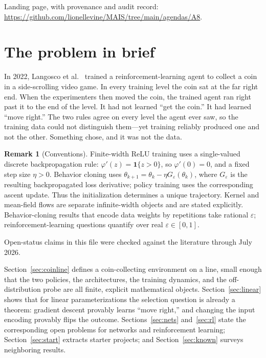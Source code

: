 \documentclass[11pt]{amsart}
\theoremstyle{plain}
\theoremstyle{definition}
\newtheorem{remark}[theorem]{Remark}
\begin{document}
\noindent Landing page, with provenance and audit record: \url{https://github.com/lionellevine/MAIS/tree/main/agendas/A8}.

\section{The problem in brief}\label{sec:brief}

In 2022, Langosco et al.~\cite{langosco2022} trained a reinforcement-learning agent to collect a coin in a side-scrolling video game. In every training level the coin sat at the far right end. When the experimenters then moved the coin, the trained agent ran right past it to the end of the level. It had not learned ``get the coin.'' It had learned ``move right.'' The two rules agree on every level the agent ever saw, so the training data could not distinguish them---yet training reliably produced one and not the other. Something chose, and it was not the data.



\begin{remark}[Conventions]
\label{rem:conventions}
Finite-width ReLU training uses a single-valued discrete backpropagation rule: $\varphi'(z)=\mathbf1\{z>0\}$, so $\varphi'(0)=0$, and a fixed step size $\eta>0$. Behavior cloning uses $\theta_{k+1}=\theta_k-\eta G_\varepsilon(\theta_k)$, where $G_\varepsilon$ is the resulting backpropagated loss derivative; policy training uses the corresponding ascent update. Thus the initialization determines a unique trajectory. Kernel and mean-field flows are separate infinite-width objects and are stated explicitly. Behavior-cloning results that encode data weights by repetitions take rational $\varepsilon$; reinforcement-learning questions quantify over real $\varepsilon\in[0,1]$.
\end{remark}

Open-status claims in this file were checked against the literature through July 2026.

Section~\ref{sec:coinline} defines a coin-collecting environment on a line, small enough that the two policies, the architectures, the training dynamics, and the off-distribution probe are all finite, explicit mathematical objects. Section~\ref{sec:linear} shows that for linear parameterizations the selection question is already a theorem: gradient descent provably learns ``move right,'' and changing the input encoding provably flips the outcome. Sections~\ref{sec:nets} and~\ref{sec:rl} state the corresponding open problems for networks and reinforcement learning; Section~\ref{sec:start} extracts starter projects; and Section~\ref{sec:known} surveys neighboring results.
\end{document}
